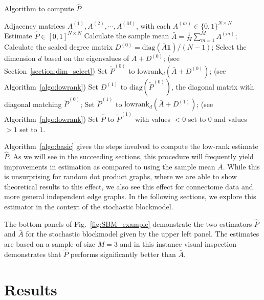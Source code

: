 \documentclass[10pt,letterpaper]{article}
\renewcommand{\hat}{\widehat}
\begin{document}
\begin{algorithm}[H]
\caption{Algorithm to compute $\hat{P}$}
\label{algo:basic}
\begin{algorithmic}[1]
\REQUIRE Adjacency matrices $A^{(1)}, A^{(2)}, \cdots, A^{(M)}$, with each $A^{(m)} \in \{0,1\}^{N \times N}$
\ENSURE Estimate $\hat{P}\in[0,1]^{N\times N}$
\STATE Calculate the sample mean $\bar{A} = \frac{1}{M}\sum\limits_{m = 1}^M A^{(m)}$;
\STATE Calculate the scaled degree matrix $D^{(0)} = \mathrm{diag}(\bar{A} \bm{1})/(N-1)$;
\STATE Select the dimension $d$ based on the eigenvalues of $\bar{A} + D^{(0)}$; (see Section~\ref{section:dim_select})
\STATE Set $\tilde{P}^{(0)}$ to $\mathrm{lowrank}_d(\bar{A} + D^{(0)})$; (see Algorithm~\ref{algo:lowrank})
\STATE Set $D^{(1)}$ to $ \mathrm{diag}(\tilde{P}^{(0)})$, the diagonal matrix with diagonal matching $\tilde{P}^{(0)}$; 
\STATE Set $\tilde{P}^{(1)}$ to $\mathrm{lowrank}_d(\bar{A} + D^{(1)})$; (see Algorithm~\ref{algo:lowrank})
\STATE Set $\hat{P}$ to $\tilde{P}^{(1)}$ with values $<0$ set to $0$ and values $>1$ set to $1$.
\end{algorithmic}
\end{algorithm}


Algorithm~\ref{algo:basic} gives the steps involved to compute the low-rank estimate $\hat{P}$.
As we will see in the succeeding sections, this procedure will frequently yield improvements in estimation as compared to using the sample mean $\bar{A}$.
While this is unsurprising for random dot product graphs, where we are able to show theoretical results to this effect, we also see this effect for connectome data and more general independent edge graphs.
In the following sections, we explore this estimator in the context of the stochastic blockmodel.

The bottom panels of Fig.~\ref{fig:SBM_example} demonstrate the two estimators $\hat{P}$ and $\bar{A}$ for the stochastic blockmodel given by the upper left panel. 
The estimates are based on a sample of size $M=3$ and in this instance visual inspection demonstrates that $\hat{P}$ performs significantly better than $\bar{A}$.



\section{Results}
\label{sec:result}
\end{document}

